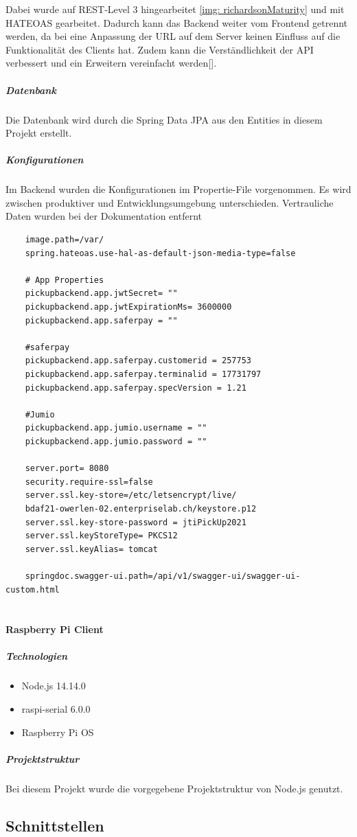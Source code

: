 Dabei wurde auf REST-Level 3 hingearbeitet \ref{img: richardsonMaturity} und mit \ac{HATEOAS} gearbeitet. Dadurch kann das Backend weiter vom Frontend getrennt werden, da bei eine Anpassung der URL auf dem Server keinen Einfluss auf die Funktionalität des Clients hat. Zudem kann die Verständlichkeit der API verbessert und ein Erweitern vereinfacht werden[\cite{richardsonMaturity}]. 
\subparagraph{Datenbank}
Die Datenbank wird durch die Spring Data JPA aus den Entities in diesem Projekt erstellt. 
\subparagraph{Konfigurationen}
Im Backend wurden die Konfigurationen im \gls{Propertie-File} vorgenommen. Es wird zwischen produktiver und Entwicklungsumgebung unterschieden. Vertrauliche Daten wurden bei der Dokumentation entfernt
\begin{verbatim}
	image.path=/var/
	spring.hateoas.use-hal-as-default-json-media-type=false
	
	# App Properties
	pickupbackend.app.jwtSecret= ""
	pickupbackend.app.jwtExpirationMs= 3600000
	pickupbackend.app.saferpay = ""
	
	#saferpay
	pickupbackend.app.saferpay.customerid = 257753
	pickupbackend.app.saferpay.terminalid = 17731797
	pickupbackend.app.saferpay.specVersion = 1.21
	
	#Jumio
	pickupbackend.app.jumio.username = ""
	pickupbackend.app.jumio.password = ""
	
	server.port= 8080
	security.require-ssl=false
	server.ssl.key-store=/etc/letsencrypt/live/
	bdaf21-owerlen-02.enterpriselab.ch/keystore.p12
	server.ssl.key-store-password = jtiPickUp2021
	server.ssl.keyStoreType= PKCS12
	server.ssl.keyAlias= tomcat
	
	springdoc.swagger-ui.path=/api/v1/swagger-ui/swagger-ui-custom.html
	
\end{verbatim}
\paragraph{Raspberry Pi Client}
\subparagraph{Technologien}
\begin{itemize}
	\item Node.js 14.14.0
	\item raspi-serial 6.0.0
	\item Raspberry Pi OS 
\end{itemize}
\subparagraph{Projektstruktur}
Bei diesem Projekt wurde die vorgegebene Projektstruktur von Node.js genutzt.

\subsection{Schnittstellen}
